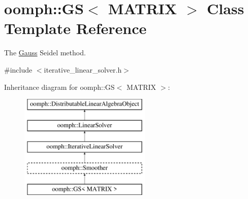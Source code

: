 \hypertarget{classoomph_1_1GS}{}\section{oomph\+:\+:GS$<$ M\+A\+T\+R\+IX $>$ Class Template Reference}
\label{classoomph_1_1GS}


The \hyperlink{classoomph_1_1Gauss}{Gauss} Seidel method.  




{\ttfamily \#include $<$iterative\+\_\+linear\+\_\+solver.\+h$>$}

Inheritance diagram for oomph\+:\+:GS$<$ M\+A\+T\+R\+IX $>$\+:\begin{figure}[H]
\begin{center}
\leavevmode
\includegraphics[height=5.000000cm]{classoomph_1_1GS}
\end{center}
\end{figure}
